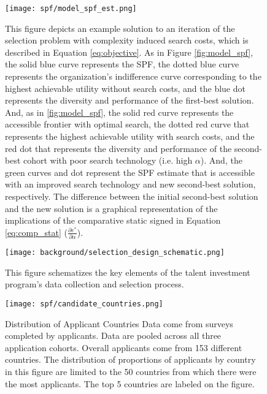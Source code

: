     \newpage
    \begin{figure}[!htb]
    \centering
        \caption{This figure depicts an example solution to an iteration of the selection problem with complexity induced search costs, which is described in Equation \ref{eq:objective}. As in Figure \ref{fig:model_spf}, the solid blue curve represents the SPF, the dotted blue curve represents the organization's indifference curve corresponding to the highest achievable utility without search costs, and the blue dot represents the diversity and performance of the first-best solution. And, as in \ref{fig:model_spf}, the solid red curve represents the accessible frontier with optimal search, the dotted red curve that represents the highest achievable utility with search costs, and the red dot that represents the diversity and performance of the second-best cohort with poor search technology (i.e. high $\alpha$). And, the green curves and dot represent the SPF estimate that is accessible with an improved search technology and new second-best solution, respectively. The difference between the initial second-best solution and the new solution is a graphical representation of the implications of the comparative static signed in Equation \ref{eq:comp_stat} ($\frac{\partial e^*}{\partial \alpha}$).}\label{fig:model_spf_est}
      \texttt{[image: spf/model\_spf\_est.png]}
    \end{figure}
    
    
    \newpage
    \null %
    \vfill
    \begin{center}
    \begin{figure}[!htb]
    \centering
        \caption{This figure schematizes the key elements of the talent investment program's data collection and selection process. }\label{fig:design}
      \texttt{[image: background/selection\_design\_schematic.png]} 
    \end{figure}
    \end{center}
    \vfill
    
    
    \newpage
    
    \begin{figure}[!htb]
    \centering
        \caption{Distribution of Applicant Countries Data come from surveys completed by applicants. Data are pooled across all three application cohorts. Overall applicants come from 153 different countries. The distribution of proportions of applicants by country in this figure are limited to the 50 countries from which there were the most applicants. The top 5 countries are labeled on the figure.  }\label{fig:country_dist_all}
      \texttt{[image: spf/candidate\_countries.png]} 
    \end{figure}
    

